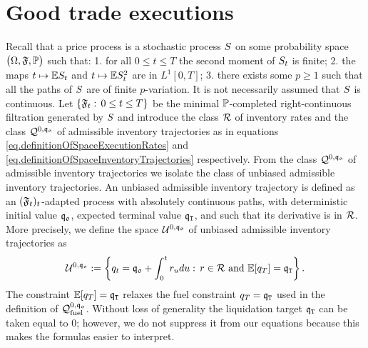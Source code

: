 \documentclass[10pt,a4paper]{article}
\begin{document}
	
	
	
	\section{Good trade executions} \label{sec.goodTradeExecutions}
	Recall that a price process is a stochastic process $S$ on some probability space $\big(\Omega,\mathfrak{F}, {\mathbb{P}} \big)$ such that: 1. for all $0\leq t\leq T$ the second moment of $S_t$ is finite; 2. the maps $t\mapsto \mathbb{{E}}S_t$ and $t\mapsto \mathbb{{E}}S^{2}_t$ are in $L^1[0,T]$; 3. there exists some $p\geq 1$ such that all the paths of $S$ are of finite $p$-variation. It is not necessarily assumed that $S$ is continuous. Let $\lbrace \mathfrak{F}_t: \, 0\leq t\leq T \rbrace$ be the minimal ${\mathbb{P}}$-completed right-continuous filtration generated by $S$ and introduce the class $\mathcal{R}$ of inventory rates and the class $\mathcal{Q}^{0,\mathfrak{q_0}}$ of admissible inventory trajectories as in equations \eqref{eq.definitionOfSpaceExecutionRates} and \eqref{eq.definitionOfSpaceInventoryTrajectories} respectively. From the class $\mathcal{Q}^{0,\mathfrak{q_0}}$ of admissible inventory trajectories we isolate the class of unbiased admissible inventory trajectories. 
	An unbiased  admissible inventory trajectory is defined as an $(\mathfrak{F}_t)_t$-adapted process with absolutely continuous paths, with deterministic initial value $\mathfrak{q_0}$, expected terminal value $\mathfrak{q}_{\mathtt{T} }$, and such that its derivative is in $\mathcal{R}$.  More precisely, we define the space $\mathcal{U}^{0,\mathfrak{q_0}}$ of unbiased admissible inventory trajectories as 
	\begin{equation*}
	\mathcal{U}^{0,\mathfrak{q_0}}:= \left\lbrace
	q_t=\mathfrak{q_0} + \int_{0}^{t}r_udu: \, r \in \mathcal{R} \text{ and } \mathbb{{E}} [q_T] = \mathfrak{q}_{\mathtt{T} }
	\right\rbrace.
	\end{equation*}
	The constraint $\mathbb{{E}} [q_T] = \mathfrak{q}_{\mathtt{T} }$ relaxes the fuel constraint $ q_T = \mathfrak{q}_{\mathtt{T} }$ used in the definition of $\mathcal{Q}_{\text{fuel}}^{0,\mathfrak{q_0}}$. Without loss of generality the liquidation target $\mathfrak{q}_{\mathtt{T} }$ can be taken equal to $0$; however, we do not suppress it from our equations because this makes the formulas easier to interpret. 
	
\end{document}
